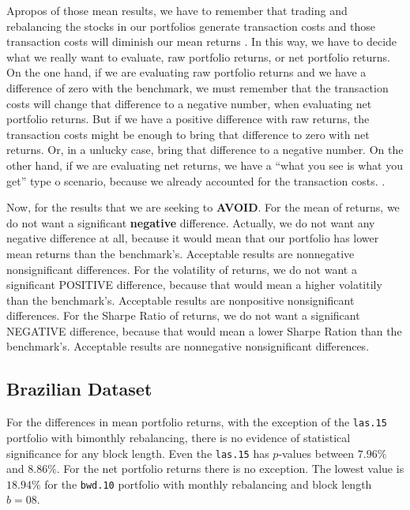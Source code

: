 \documentclass[12pt,oneside,a4paper]{memoir}
\begin{document}
Apropos of those mean results, we have to remember that trading and rebalancing the stocks in our portfolios generate transaction costs and those transaction costs will diminish our mean returns \cite{barber-2000}.
In this way, we have to decide what we really want to evaluate, raw portfolio returns, or net portfolio returns.
On the one hand, if we are evaluating raw portfolio returns and we have a difference of zero with the benchmark, we must remember that the transaction costs will change that difference to a negative number, when evaluating net portfolio returns.
But if we have a positive difference with raw returns, the transaction costs might be enough to bring that difference to zero with net returns.
Or, in a unlucky case, bring that difference to a negative number.
On the other hand, if we are evaluating net returns, we have a ``what you see is what you get'' type o scenario, because we already accounted for the transaction costs.
.


Now, for the results that we are seeking to \textbf{AVOID}.
For the mean of returns, we do not want a significant \textbf{negative} difference.
Actually, we do not want any negative difference at all,
because it would mean that our portfolio has lower mean returns than the benchmark's. 
Acceptable results are nonnegative nonsignificant differences.
For the volatility of returns, we do not want a significant POSITIVE difference,
because that would mean a higher volatitily than the benchmark's.
Acceptable results are nonpositive nonsignificant differences.
For the Sharpe Ratio of returns, we do not want a significant NEGATIVE difference,
because that would mean a lower Sharpe Ration than the benchmark's.
Acceptable results are nonnegative nonsignificant differences.

\subsection{Brazilian Dataset}

For the differences in mean portfolio returns, with the exception of the \texttt{las.15} portfolio with bimonthly rebalancing, there is no evidence of statistical significance for any block length.
Even the \texttt{las.15} has $p$-values between $7.96\%$ and $8.86\%$.
For the net portfolio returns there is no exception.
The lowest value is $18.94\%$ for the \texttt{bwd.10} portfolio with monthly rebalancing and block length $b=08$.
\end{document}
